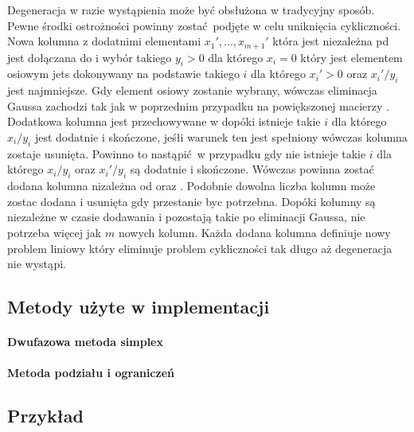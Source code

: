 \begin{enumerate}
Degeneracja w razie wystąpienia może być obsłużona w tradycyjny sposób. Pewne środki ostrożności powinny zostać podjęte w celu uniknięcia cykliczności. Nowa kolumna  z dodatnimi elementami $x_1',\dots,x_{m+1}'$ która jest niezależna pd  jest dołączana do  i wybór takiego $y_i > 0$ dla którego $x_i = 0$ który jest elementem osiowym jets dokonywany na podstawie takiego $i$ dla którego $x_i' > 0$ oraz $x_i'/y_i$ jest najmniejsze. Gdy element osiowy zostanie wybrany, wówczas eliminacja Gaussa zachodzi tak jak w poprzednim przypadku na powiększonej macierzy . Dodatkowa kolumna jest przechowywane w  dopóki istnieje takie $i$ dla którego $x_i/y_i$ jest dodatnie i skończone, jeśłi warunek ten jest spełniony wówczas kolumna zostaje usunięta. Powinno to nastąpić w przypadku gdy nie istnieje takie $i$ dla którego $x_i/y_i$ oraz $x_i'/y_i$ są dodatnie i skończone. Wówczas powinna zostać dodana kolumna  nizależna od  oraz . Podobnie dowolna liczba kolumn może zostac dodana i usunięta gdy przestanie byc potrzebna. Dopóki kolumny są niezależne w czasie dodawania i pozostają takie po eliminacji Gaussa, nie potrzeba więcej jak $m$ nowych kolumn. Każda dodana kolumna definiuje nowy problem liniowy który eliminuje problem cykliczności tak długo aż degeneracja nie wystąpi.

\end{enumerate}

\subsection{Metody użyte w implementacji}

\paragraph{Dwufazowa metoda simplex}
\paragraph{Metoda podziału i ograniczeń}

\subsection{Przykład}
